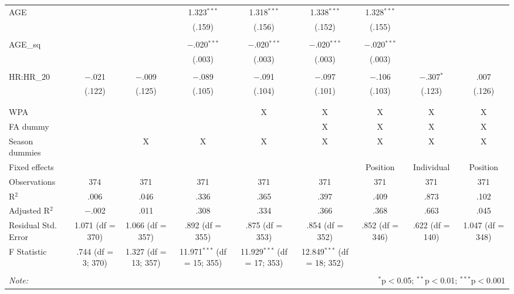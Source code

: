 \begin{table}[H]
\begin{tabular}{@{\extracolsep{5pt}}lcccccccc}
 AGE &  &  & 1.323$^{***}$ & 1.318$^{***}$ & 1.338$^{***}$ & 1.328$^{***}$ &  &  \\
  &  &  & (.159) & (.156) & (.152) & (.155) &  &  \\
  & & & & & & & & \\
 AGE\_sq &  &  & $-$.020$^{***}$ & $-$.020$^{***}$ & $-$.020$^{***}$ & $-$.020$^{***}$ &  &  \\
  &  &  & (.003) & (.003) & (.003) & (.003) &  &  \\
  & & & & & & & & \\
 HR:HR\_20 & $-$.021 & $-$.009 & $-$.089 & $-$.091 & $-$.097 & $-$.106 & $-$.307$^{*}$ & .007 \\
  & (.122) & (.125) & (.105) & (.104) & (.101) & (.103) & (.123) & (.126) \\
  & & & & & & & & \\
\hline \\[-1.8ex]
WPA &  &  &  & X & X & X & X & X \\
FA dummy &  &  &  &  & X & X & X & X \\
Season dummies &  & X & X & X & X & X & X & X \\
Fixed effects &  &  &  &  &  & Position & Individual & Position \\
Observations & 374 & 371 & 371 & 371 & 371 & 371 & 371 & 371 \\
R$^{2}$ & .006 & .046 & .336 & .365 & .397 & .409 & .873 & .102 \\
Adjusted R$^{2}$ & $-$.002 & .011 & .308 & .334 & .366 & .368 & .663 & .045 \\
Residual Std. Error & 1.071 (df = 370) & 1.066 (df = 357) & .892 (df = 355) & .875 (df = 353) & .854 (df = 352) & .852 (df = 346) & .622 (df = 140) & 1.047 (df = 348) \\
F Statistic & .744 (df = 3; 370) & 1.327 (df = 13; 357) & 11.971$^{***}$ (df = 15; 355) & 11.929$^{***}$ (df = 17; 353) & 12.849$^{***}$ (df = 18; 352) &  &  &  \\
\hline
\hline \\[-1.8ex]
\textit{Note:}  & \multicolumn{8}{r}{$^{*}$p$<$0.05; $^{**}$p$<$0.01; $^{***}$p$<$0.001} \\
\end{tabular}
\end{table}
